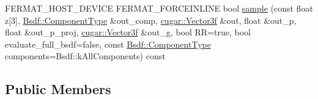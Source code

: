 \begin{DoxyCompactItemize}
\item 
F\+E\+R\+M\+A\+T\+\_\+\+H\+O\+S\+T\+\_\+\+D\+E\+V\+I\+CE F\+E\+R\+M\+A\+T\+\_\+\+F\+O\+R\+C\+E\+I\+N\+L\+I\+NE bool \hyperlink{struct_eye_vertex_a7664ec5102f1894a1cd55c324c0742ee}{sample} (const float z\mbox{[}3\mbox{]}, \hyperlink{struct_bsdf_a5f7db6f81220ed9ee6da109d6eb5b585}{Bsdf\+::\+Component\+Type} \&out\+\_\+comp, \hyperlink{structcugar_1_1_vector}{cugar\+::\+Vector3f} \&out, float \&out\+\_\+p, float \&out\+\_\+p\+\_\+proj, \hyperlink{structcugar_1_1_vector}{cugar\+::\+Vector3f} \&out\+\_\+g, bool RR=true, bool evaluate\+\_\+full\+\_\+bsdf=false, const \hyperlink{struct_bsdf_a5f7db6f81220ed9ee6da109d6eb5b585}{Bsdf\+::\+Component\+Type} components=Bsdf\+::k\+All\+Components) const
\end{DoxyCompactItemize}
\subsection*{Public Members}
